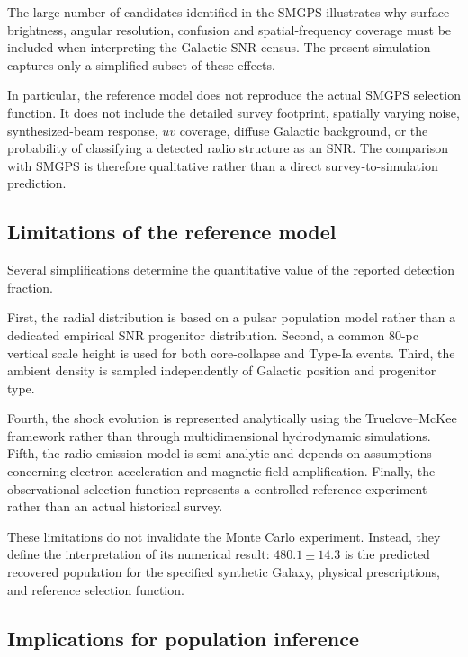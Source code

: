 \documentclass[
aps,
prd,
reprint,
superscriptaddress,
nofootinbib
]{revtex4-2}
\begin{document}
	The large number of candidates identified in the SMGPS illustrates why
	surface brightness, angular resolution, confusion and spatial-frequency
	coverage must be included when interpreting the Galactic SNR census.
	The present simulation captures only a simplified subset of these effects.
	
	In particular, the reference model does not reproduce the actual SMGPS
	selection function.  It does not include the detailed survey footprint,
	spatially varying noise, synthesized-beam response, $uv$ coverage, diffuse
	Galactic background, or the probability of classifying a detected radio
	structure as an SNR.  The comparison with SMGPS is therefore qualitative
	rather than a direct survey-to-simulation prediction.
	
	\subsection{Limitations of the reference model}
	
	Several simplifications determine the quantitative value of the reported
	detection fraction.
	
	First, the radial distribution is based on a pulsar population model rather
	than a dedicated empirical SNR progenitor distribution.  Second, a common
	80-pc vertical scale height is used for both core-collapse and Type-Ia
	events.  Third, the ambient density is sampled independently of Galactic
	position and progenitor type.
	
	Fourth, the shock evolution is represented analytically using the
	Truelove--McKee framework rather than through multidimensional hydrodynamic
	simulations.  Fifth, the radio emission model is semi-analytic and depends on
	assumptions concerning electron acceleration and magnetic-field amplification.
	Finally, the observational selection function represents a controlled
	reference experiment rather than an actual historical survey.
	
	These limitations do not invalidate the Monte Carlo experiment.  Instead,
	they define the interpretation of its numerical result: $480.1\pm14.3$ is
	the predicted recovered population for the specified synthetic Galaxy,
	physical prescriptions, and reference selection function.
	
	\subsection{Implications for population inference}
	
\end{document}
